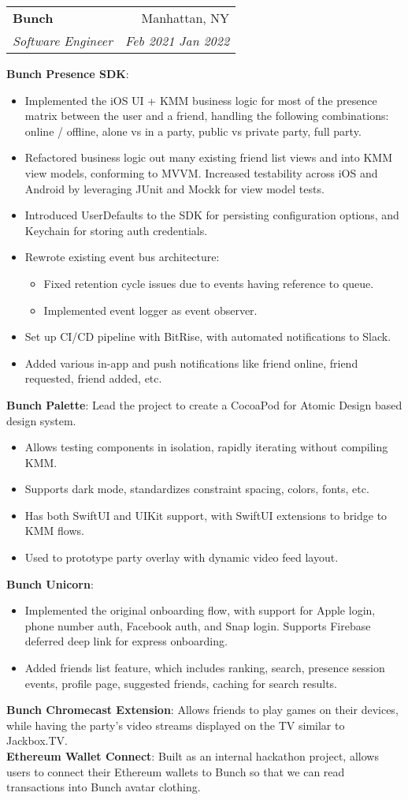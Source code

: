\documentclass{article}
\makeatletter
\newcommand{\resumeProject}[1]{\small{\textbf{#1}{:}}}
\newcommand{\resumeProjectWithDescription}[2]{\small{\textbf{#1}{: #2\vspace{-2pt}}}}
\newcommand{\resumeProjectItem}[1]{\item\small{{#1}}}
\newcommand{\resumeSubheading}[4]{
  \vspace{-1pt}\item
    \begin{tabular*}{0.97\textwidth}[t]{l@{\extracolsep{\fill}}r}
      \textbf{#1}&#2 \\
      \textit{\small#3}&\textit{\small#4} \\
    \end{tabular*}
}
\newcommand{\resumeItemListStart}{\vspace{-4pt}\begin{itemize}}
\newcommand{\resumeItemListEnd}{\end{itemize}\vspace{-4pt}}
\makeatother
\begin{document}
    \resumeSubheading{Bunch}{Manhattan, NY}{Software Engineer}{Feb 2021 \textendash{} Jan 2022}
      \resumeProject{Bunch Presence SDK}
      \resumeItemListStart{}
        \resumeProjectItem{Implemented the iOS UI + KMM business logic for most of the presence matrix between the user and a friend, handling the following combinations: online / offline, alone vs in a party, public vs private party, full party.}
        \resumeProjectItem{Refactored business logic out many existing friend list views and into KMM view models, conforming to MVVM. Increased testability across iOS and Android by leveraging JUnit and Mockk for view model tests.}
        \resumeProjectItem{Introduced UserDefaults to the SDK for persisting configuration options, and Keychain for storing auth credentials.}
        \resumeProjectItem{Rewrote existing event bus architecture:}
        \resumeItemListStart{}
          \resumeProjectItem{Fixed retention cycle issues due to events having reference to queue.}
          \resumeProjectItem{Implemented event logger as event observer.}
        \resumeItemListEnd{}
        \resumeProjectItem{Set up CI/CD pipeline with BitRise, with automated notifications to Slack.}
        \resumeProjectItem{Added various in-app and push notifications like friend online, friend requested, friend added, etc.}
      \resumeItemListEnd{}
      \resumeProjectWithDescription{Bunch Palette}{Lead the project to create a CocoaPod for Atomic Design based design system.}
      \resumeItemListStart{}
        \resumeProjectItem{Allows testing components in isolation, rapidly iterating without compiling KMM.}
        \resumeProjectItem{Supports dark mode, standardizes constraint spacing, colors, fonts, etc.}
        \resumeProjectItem{Has both SwiftUI and UIKit support, with SwiftUI extensions to bridge to KMM flows.}
        \resumeProjectItem{Used to prototype party overlay with dynamic video feed layout.}
      \resumeItemListEnd{}
      \resumeProject{Bunch Unicorn}
      \resumeItemListStart{}
        \resumeProjectItem{Implemented the original onboarding flow, with support for Apple login, phone number auth, Facebook auth, and Snap login\@. Supports Firebase deferred deep link for express onboarding.}
        \resumeProjectItem{Added friends list feature, which includes ranking, search, presence session events, profile page, suggested friends, caching for search results.}
      \resumeItemListEnd{}
      \resumeProjectWithDescription{Bunch Chromecast Extension}
        {Allows friends to play games on their devices, while having the party's video streams displayed on the TV similar to Jackbox.TV.} \\
      \vspace{4pt}\resumeProjectWithDescription{Ethereum Wallet Connect}
        {Built as an internal hackathon project, allows users to connect their Ethereum wallets to Bunch so that we can read transactions into Bunch avatar clothing.}
\end{document}
